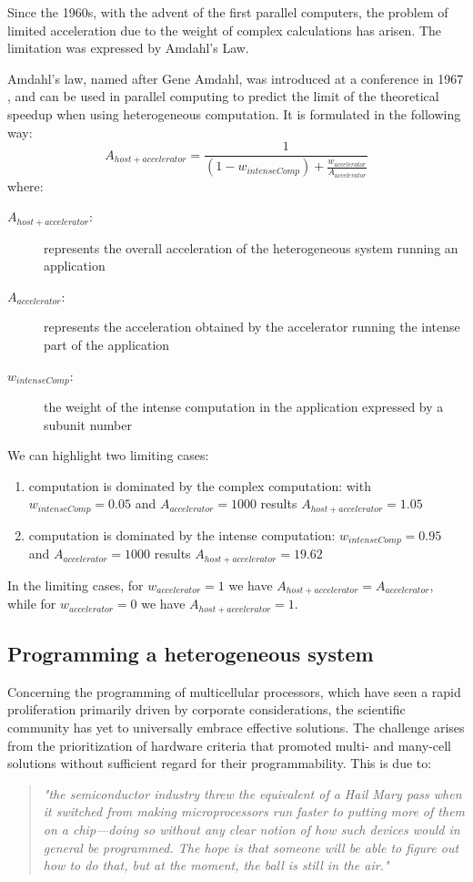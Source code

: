 Since the 1960s, with the advent of the first parallel computers, the problem of limited acceleration due to the weight of complex calculations has arisen. The limitation was expressed by Amdahl's Law.

Amdahl's law, named after  Gene Amdahl,  was introduced  at a conference in 1967 \cite{amdahl1967}, and can be used in parallel computing to predict the limit of the theoretical speedup when using heterogeneous computation. It is formulated in the following way:
$$A_{host+accelerator} = \frac{1}{(1-w_{intenseComp}) + \frac{w_{accelerator}}{A_{accelerator}}}$$
where:
\begin{description}
    \item[$A_{host+accelerator}$:] represents the overall acceleration of the heterogeneous system running an application
    \item[$A_{accelerator}$:] represents the acceleration obtained by the accelerator running the intense part of the application
    \item[$w_{intenseComp}$:] the weight of the intense computation in the application expressed by a subunit number
\end{description}
We can highlight two limiting cases:
\begin{enumerate}
    \item computation is dominated by the complex computation: with $w_{intenseComp} = 0.05$ and $A_{accelerator} = 1000$ results $A_{host+accelerator} = 1.05$
    \item computation is dominated by the intense computation: $w_{intenseComp} = 0.95$ and $A_{accelerator} = 1000$ results $A_{host+accelerator} = 19.62$
\end{enumerate}
In the limiting cases, for $w_{accelerator} = 1$ we have $A_{host+accelerator} = A_{accelerator}$, while for $w_{accelerator} = 0$ we have $A_{host+accelerator} = 1$.

\subsection{Programming a heterogeneous system}

Concerning the programming of multicellular processors, which have seen a rapid proliferation primarily driven by corporate considerations, the scientific community has yet to universally embrace effective solutions. The challenge arises from the prioritization of hardware criteria that promoted multi- and many-cell solutions without sufficient regard for their programmability. This is due to:
{\small
\begin{quote}
{\em "the semiconductor industry threw the equivalent of a Hail
Mary pass when it switched from making microprocessors run faster to
putting more of them on a chip—doing so without any clear notion of how
such devices would in general be programmed. The hope is that someone
will be able to figure out how to do that, but at the moment, the ball is still in the air."} \cite{Patterson10}
\end{quote}
}


